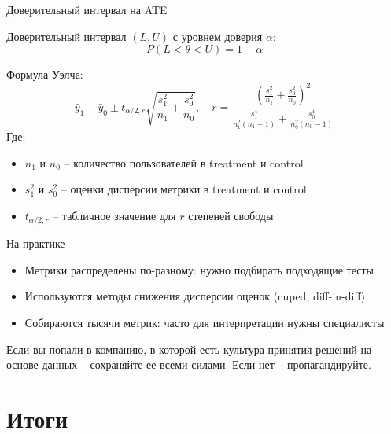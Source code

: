 \documentclass[11pt,aspectratio=169]{beamer}
\begin{document}
\begin{frame}{Доверительный интервал на ATE}

Доверительный интервал $(L, U)$ с уровнем доверия $\alpha$:
\[
P(L < \theta < U) = 1 - \alpha
\]

Формула Уэлча:
\[
\bar y_1 - \bar y_0 \pm t_{\alpha/2,r} \sqrt{\frac{s_1^2}{n_1} + \frac{s_0^2}{n_0}}, \quad
r = \frac{ \left( \frac{s_1^2}{n_1} + \frac{s_0^2}{n_0} \right)^2 }{ \frac{s_1^4}{n_1^2 (n_1 - 1)} + \frac{s_0^4}{n_0^2 (n_0 - 1)} }
\]
Где:
\begin{itemize}
\item $n_1$ и $n_0$ -- количество пользователей в treatment и control
\item $s_1^2$ и $s_0^2$ -- оценки дисперсии метрики в treatment и control
\item $t_{\alpha/2,r}$ -- табличное значение для $r$ степеней свободы
\end{itemize}

\end{frame}

\begin{frame}{На практике}

\begin{itemize}
\item Метрики распределены по-разному: нужно подбирать подходящие тесты
\item Используются методы снижения дисперсии оценок (cuped, diff-in-diff)
\item Собираются тысячи метрик: часто для интерпретации нужны специалисты
\end{itemize}

\vfill

\begin{tcolorbox}[colback=info!5,colframe=info!80]
Если вы попали в компанию, в которой есть культура принятия решений на основе данных -- сохраняйте ее всеми силами. Если нет -- пропагандируйте.
\end{tcolorbox}

\end{frame}

\section{Итоги}
\end{document}
